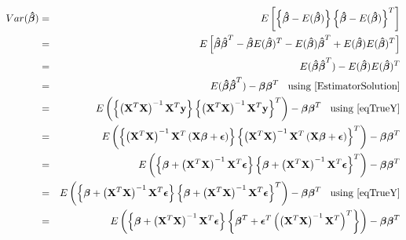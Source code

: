 \documentclass[11pt]{article}
\theoremstyle{remark}
\begin{document}
\begin{eqnarray}
Var(\boldsymbol{\hat{\beta}}) &=& E\left[ \left\{  \boldsymbol{\hat{\beta}}-E(\boldsymbol{\hat{\beta}})  \right\} \left\{  \boldsymbol{\hat{\beta}}-E(\boldsymbol{\hat{\beta}})  \right\}^T \right]\nonumber\\
&=& E\left[\boldsymbol{\hat{\beta}}\boldsymbol{\hat{\beta}}^T - \boldsymbol{\hat{\beta}}E(\boldsymbol{\hat{\beta}})^T  - E(\boldsymbol{\hat{\beta}})\boldsymbol{\hat{\beta}}^T + E(\boldsymbol{\hat{\beta}})E(\boldsymbol{\hat{\beta}})^T\right]\nonumber\\
&=& E(\boldsymbol{\hat{\beta}}\boldsymbol{\hat{\beta}}^T) - E(\boldsymbol{\hat{\beta}})E(\boldsymbol{\hat{\beta}})^T\nonumber\\
&=& E(\boldsymbol{\hat{\beta}}\boldsymbol{\hat{\beta}}^T) - \boldsymbol{\beta}\boldsymbol{\beta}^T\:\:\:\:\text{using \eqref{EstimatorSolution}}\nonumber\\
&=& E\left(\left\{\left(\bold{X}^T\bold{X}\right)^{-1}\bold{X}^T\bold{y}\right\}\left\{\left(\bold{X}^T\bold{X}\right)^{-1}\bold{X}^T\bold{y}\right\}^T\right) - \boldsymbol{\beta}\boldsymbol{\beta}^T\:\:\:\:\text{using \eqref{eqTrueY}}\nonumber\\
&=& E\left(\left\{\left(\bold{X}^T\bold{X}\right)^{-1}\bold{X}^T\left(\bold{X}\boldsymbol{\beta} + \boldsymbol{\epsilon}\right)\right\}\left\{\left(\bold{X}^T\bold{X}\right)^{-1}\bold{X}^T\left(\bold{X}\boldsymbol{\beta} + \boldsymbol{\epsilon}\right)\right\}^T\right) - \boldsymbol{\beta}\boldsymbol{\beta}^T\nonumber\\
&=& E\left(\left\{\boldsymbol{\beta} + \left(\bold{X}^T\bold{X}\right)^{-1}\bold{X}^T\boldsymbol{\epsilon}\right\}\left\{\boldsymbol{\beta} + \left(\bold{X}^T\bold{X}\right)^{-1}\bold{X}^T\boldsymbol{\epsilon}\right\}^T\right) - \boldsymbol{\beta}\boldsymbol{\beta}^T\nonumber\\
&=& E\left(\left\{\boldsymbol{\beta} + \left(\bold{X}^T\bold{X}\right)^{-1}\bold{X}^T\boldsymbol{\epsilon}\right\}\left\{\boldsymbol{\beta} + \left(\bold{X}^T\bold{X}\right)^{-1}\bold{X}^T\boldsymbol{\epsilon}\right\}^T\right) - \boldsymbol{\beta}\boldsymbol{\beta}^T\:\:\:\:\text{using \eqref{eqTrueY}}\nonumber\\
&=& E\left(\left\{\boldsymbol{\beta} + \left(\bold{X}^T\bold{X}\right)^{-1}\bold{X}^T\boldsymbol{\epsilon}\right\}\left\{\boldsymbol{\beta}^T + \boldsymbol{\epsilon}^T\left(\left(\bold{X}^T\bold{X}\right)^{-1}\bold{X}^T\right)^T\right\}\right) - \boldsymbol{\beta}\boldsymbol{\beta}^T\nonumber\\

\end{eqnarray}
\end{document}
